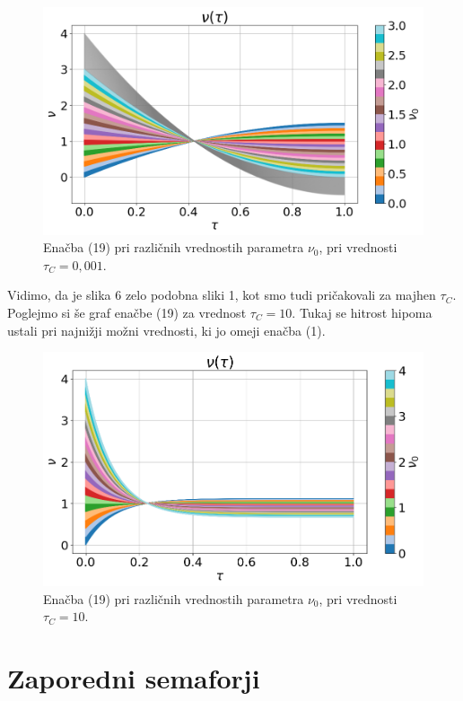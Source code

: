 \documentclass[slovene,11pt,a4paper]{article}
\begin{document}
\begin{figure}[h!]
\centering
\includegraphics[width=\linewidth]{HitrostFunkcional1.png}
\caption{Enačba (19) pri različnih vrednostih parametra $\nu_0$, pri vrednosti $\tau_C = 0,001$.}
\end{figure}
Vidimo, da je slika 6 zelo podobna sliki 1, kot smo tudi pričakovali za majhen $\tau_C$. Poglejmo si še graf enačbe (19) za vrednost $\tau_C = 10$. Tukaj se hitrost hipoma ustali pri najnižji možni vrednosti, ki jo omeji enačba (1).

\newpage

\begin{figure}[h!]
\centering
\includegraphics[width=\linewidth]{HitrostFunkcional2.png}
\caption{Enačba (19) pri različnih vrednostih parametra $\nu_0$, pri vrednosti $\tau_C = 10$.}
\end{figure}

\section{Zaporedni semaforji}
\end{document}
